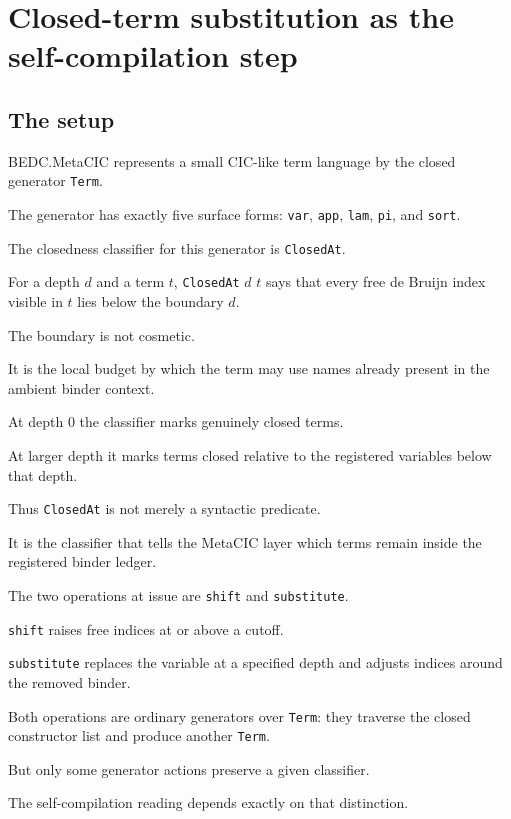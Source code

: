 \chapter{Closed-term substitution as the self-compilation step}
\label{ch:closed-term-substitution-self-compile}

\section{The setup}
\label{sec:closed-term-substitution-setup}

BEDC.MetaCIC represents a small CIC-like term language by the closed generator
\texttt{Term}.

The generator has exactly five surface forms:
\texttt{var},
\texttt{app},
\texttt{lam},
\texttt{pi},
and \texttt{sort}.

The closedness classifier for this generator is \texttt{ClosedAt}.

For a depth $d$ and a term $t$,
\texttt{ClosedAt} $d$ $t$ says that every free de Bruijn index visible in $t$
lies below the boundary $d$.

The boundary is not cosmetic.

It is the local budget by which the term may use names already present in the
ambient binder context.

At depth $0$ the classifier marks genuinely closed terms.

At larger depth it marks terms closed relative to the registered variables below
that depth.

Thus \texttt{ClosedAt} is not merely a syntactic predicate.

It is the classifier that tells the MetaCIC layer which terms remain inside the
registered binder ledger.

The two operations at issue are \texttt{shift} and \texttt{substitute}.

\texttt{shift} raises free indices at or above a cutoff.

\texttt{substitute} replaces the variable at a specified depth and adjusts
indices around the removed binder.

Both operations are ordinary generators over \texttt{Term}: they traverse the
closed constructor list and produce another \texttt{Term}.

But only some generator actions preserve a given classifier.

The self-compilation reading depends exactly on that distinction.

